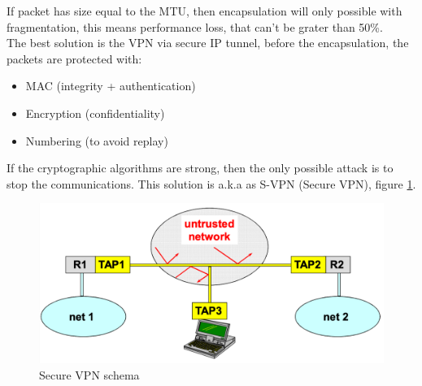 \documentclass[12pt]{article}
\begin{document}
If packet has size equal to the MTU, then encapsulation will only possible with fragmentation, this means performance loss, that can't be grater than 50\%.\\
The best solution is the VPN via secure IP tunnel, before the encapsulation, the packets are protected with:
\begin{itemize}
  \item MAC (integrity + authentication)
  \item Encryption (confidentiality)
  \item Numbering (to avoid replay)
\end{itemize}
If the cryptographic algorithms are strong, then the only possible attack is to stop the communications. This solution is a.k.a as S-VPN (Secure VPN), figure \ref{fig:svpn}.
\begin{figure}[H]
   \centering
   \includegraphics[width=\linewidth]{images/svpn.png}
   \caption{Secure VPN schema}
   \label{fig:svpn}
\end{figure}
\end{document}
